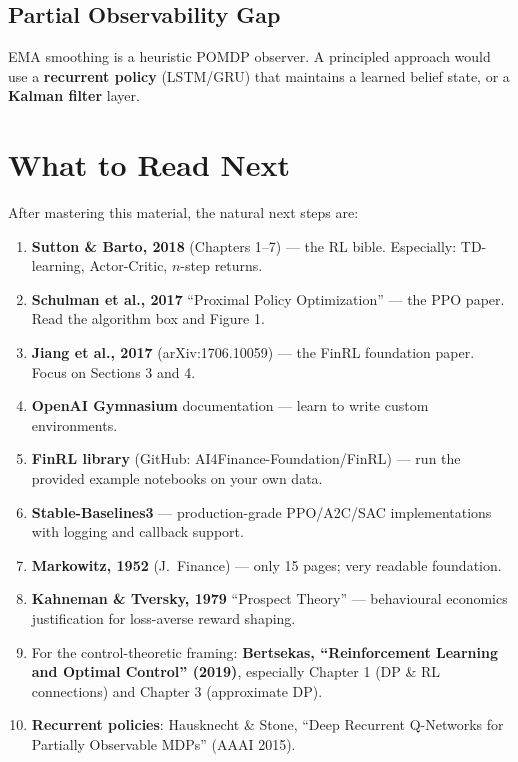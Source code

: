 \documentclass[12pt,a4paper]{article}
\begin{document}
\subsection{Partial Observability Gap}

EMA smoothing is a heuristic POMDP observer.  A principled approach would
use a \textbf{recurrent policy} (LSTM/GRU) that maintains a learned belief
state, or a \textbf{Kalman filter} layer.

\section{What to Read Next}

After mastering this material, the natural next steps are:

\begin{enumerate}
  \item \textbf{Sutton \& Barto, 2018} (Chapters 1--7) --- the RL bible.
        Especially: TD-learning, Actor-Critic, $n$-step returns.
  \item \textbf{Schulman et al., 2017} ``Proximal Policy Optimization'' ---
        the PPO paper.  Read the algorithm box and Figure 1.
  \item \textbf{Jiang et al., 2017} (arXiv:1706.10059) --- the FinRL
        foundation paper.  Focus on Sections 3 and 4.
  \item \textbf{OpenAI Gymnasium} documentation ---
        learn to write custom environments.
  \item \textbf{FinRL library} (GitHub: AI4Finance-Foundation/FinRL) ---
        run the provided example notebooks on your own data.
  \item \textbf{Stable-Baselines3} --- production-grade PPO/A2C/SAC
        implementations with logging and callback support.
  \item \textbf{Markowitz, 1952} (J.\ Finance) --- only 15 pages; very
        readable foundation.
  \item \textbf{Kahneman \& Tversky, 1979} ``Prospect Theory'' ---
        behavioural economics justification for loss-averse reward shaping.
  \item For the control-theoretic framing:
        \textbf{Bertsekas, ``Reinforcement Learning and Optimal Control''
        (2019)}, especially Chapter 1 (DP \& RL connections) and Chapter 3
        (approximate DP).
  \item \textbf{Recurrent policies}: Hausknecht \& Stone, ``Deep Recurrent
        Q-Networks for Partially Observable MDPs'' (AAAI 2015).
\end{enumerate}
\end{document}
